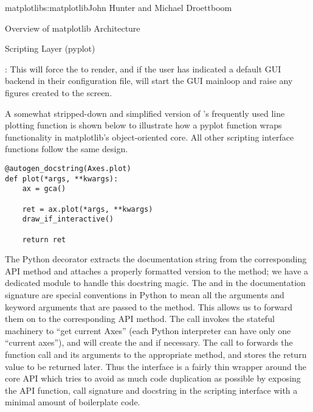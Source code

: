 \begin{aosachapter}{matplotlib}{s:matplotlib}{John Hunter and Michael Droettboom}
\begin{aosasect1}{Overview of matplotlib Architecture}
\begin{aosasect2}{Scripting Layer (pyplot)}
\begin{aosaitemize}
\item {}: This will force the  to render,
  and if the user has indicated a default GUI backend in their
  configuration file, will start the GUI mainloop and raise any
  figures created to the screen.

\end{aosaitemize}

A somewhat stripped-down and simplified version of 's
frequently used line plotting function 
is shown below to illustrate how a pyplot function wraps functionality
in matplotlib's object-oriented core.  All other  scripting
interface functions follow the same design.

\begin{verbatim}
@autogen_docstring(Axes.plot)
def plot(*args, **kwargs):
    ax = gca()

    ret = ax.plot(*args, **kwargs)
    draw_if_interactive()

    return ret
\end{verbatim}

The Python decorator  extracts
the documentation string from the corresponding API method and
attaches a properly formatted version to the 
method; we have a dedicated module  to
handle this docstring magic.  The  and  in
the documentation signature are special conventions in Python to mean
all the arguments and keyword arguments that are passed to the method.
This allows us to forward them on to the corresponding API method.
The call  invokes the stateful machinery to ``get
current Axes'' (each Python interpreter can have only one ``current
axes''), and will create the  and  if
necessary.  The call to  forwards
the function call and its arguments to the appropriate 
method, and stores the return value to be returned later.  Thus the
 interface is a fairly thin wrapper around the core
 API which tries to avoid as much code duplication as
possible by exposing the API function, call signature and docstring in
the scripting interface with a minimal amount of boilerplate code.

\end{aosasect2}

\end{aosasect1}


\end{aosachapter}
